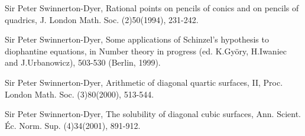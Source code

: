 \documentclass[12pt]{article}
\begin{document}
\noindent [13] Sir Peter Swinnerton-Dyer, Rational points on pencils of conics
and on pencils of quadrics, J. London Math. Soc. (2)50(1994), 231-242.

\noindent [14] Sir Peter Swinnerton-Dyer, Some applications of Schinzel's
hypothesis to diophantine equations, in Number theory in progress (ed.
K.Gy\"{o}ry, H.Iwaniec and J.Urbanowicz), 503-530 (Berlin, 1999).

\noindent [15] Sir Peter Swinnerton-Dyer, Arithmetic of diagonal quartic
surfaces, II, Proc. London Math. Soc. (3)80(2000), 513-544.

\noindent [16] Sir Peter Swinnerton-Dyer, The solubility of diagonal cubic
surfaces, Ann. Scient. \'{E}c. Norm. Sup. (4)34(2001), 891-912.
\end{document}
